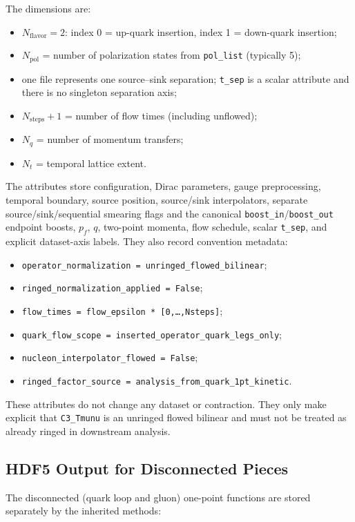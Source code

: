 \documentclass[11pt,a4paper]{article}
\newcommand{\code}[1]{\texttt{#1}}
\begin{document}
The dimensions are:
\begin{itemize}
  \item $N_{\text{flavor}} = 2$: index 0 = up-quark insertion, index 1 = down-quark insertion;
  \item $N_{\text{pol}}$ = number of polarization states from \texttt{pol\_list} (typically 5);
  \item one file represents one source--sink separation; \code{t\_sep} is a
        scalar attribute and there is no singleton separation axis;
  \item $N_{\text{steps}}+1$ = number of flow times (including unflowed);
  \item $N_{q}$ = number of momentum transfers;
  \item $N_{t}$ = temporal lattice extent.
\end{itemize}

The attributes store configuration, Dirac parameters, gauge preprocessing,
temporal boundary, source position,
source/sink interpolators, separate source/sink/sequential smearing flags and
the canonical \code{boost\_in}/\code{boost\_out} endpoint boosts, \(p_f\),
\(q\), two-point momenta, flow schedule, scalar \code{t\_sep},
and explicit dataset-axis labels.  They also record convention metadata:
\begin{itemize}
  \item \code{operator\_normalization = unringed\_flowed\_bilinear};
  \item \code{ringed\_normalization\_applied = False};
  \item \code{flow\_times = flow\_epsilon * [0,\ldots,Nsteps]};
  \item \code{quark\_flow\_scope = inserted\_operator\_quark\_legs\_only};
  \item \code{nucleon\_interpolator\_flowed = False};
  \item \code{ringed\_factor\_source = analysis\_from\_quark\_1pt\_kinetic}.
\end{itemize}
These attributes do not change any dataset or contraction.  They only make
explicit that \code{C3\_Tmunu} is an unringed flowed bilinear and must not be
treated as already ringed in downstream analysis.

\subsection{HDF5 Output for Disconnected Pieces}

The disconnected (quark loop and gluon) one-point functions are stored separately
by the inherited methods:
\end{document}
